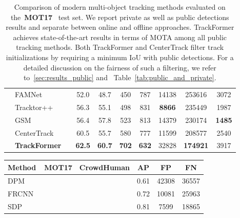 \documentclass[10pt,twocolumn,letterpaper]{article}
\newcommand{\tablestyle}[2]{\setlength{\tabcolsep}{#1}\renewcommand{\arraystretch}{#2}\centering\footnotesize}
\newcommand{\tabref}[1]{Table~\ref{#1}}
\begin{document}
\begin{table}[ht]
\begin{center}
\begin{tabular}[t]{llH cc >{\scriptsize}c>{\scriptsize}c>{\scriptsize}c>{\scriptsize}c>{\scriptsize}c}
        \midrule


\parbox[t]{3mm}{}
& FAMNet~\cite{famnet}        &           & 52.0 & 48.7 & 450 & 787 & 14138 & 253616 & 3072  \\
& Tracktor++~\cite{tracktor}   &          & 56.3 & 55.1 & 498 & 831 & \textbf{8866} & 235449 & 1987  \\
& GSM~\cite{GSM}      &         & 56.4 & 57.8 & 523 & 813 & 14379 & 230174 & \textbf{1485} \\
& CenterTrack ~\cite{center_track} &         & 60.5 & 55.7 & 580 & 777 & 11599 & 208577 & 2540  \\




& \textbf{TrackFormer}               &                     & \textbf{62.5} & \textbf{60.7} & \textbf{702} & \textbf{632} & 32828 & \textbf{174921} & 3917  \\
\bottomrule
    \end{tabular}
    \end{center}
\caption{
        Comparison of modern multi-object tracking methods evaluated on the~\textbf{MOT17}~\cite{MOT16} test set.
We report private as well as public detections results and separate between online and offline approaches.
TrackFormer achieves state-of-the-art results in terms of MOTA among all public tracking methods.
Both TrackFormer and CenterTrack filter track initializations by requiring a minimum IoU with public detections.
For a detailed discussion on the fairness of such a filtering, we refer to~\ref{sec:results_public} and ~\tabref{tab:public_and_private}. }
\label{tab:mot_eval}
\end{table} \begin{table}
\tablestyle{1.2pt}{1.05}
    \begin{center}
        \begin{tabular}[t]{lHH ccc}
            \toprule
            Method                  & MOT17         & CrowdHuman    & AP  & FP  & FN \\

            \midrule

            DPM~\cite{dpmpami2009}                     &       &       & 0.61 & 42308 & 36557\\
            FRCNN~\cite{rennips2015}                   &       &               & 0.72 & 10081 & 25963\\
            SDP~\cite{sdpYangcvpr2016}                     &       &               & 0.81 & 7599 & 18865\\


\end{tabular}
\end{center}
\end{table}
\end{document}
